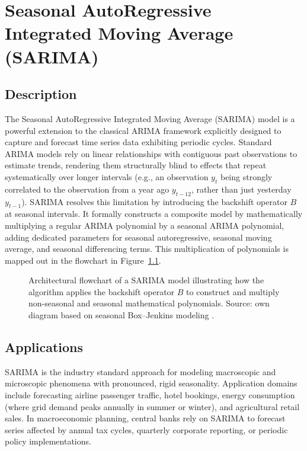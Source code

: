 %
%
%

\chapter{Seasonal AutoRegressive Integrated Moving Average (SARIMA)}
\label{ch:sarima}

\section{Description}
The Seasonal AutoRegressive Integrated Moving Average (SARIMA) model is a powerful extension to the classical ARIMA framework explicitly designed to capture and forecast time series data exhibiting periodic cycles. Standard ARIMA models rely on linear relationships with contiguous past observations to estimate trends, rendering them structurally blind to effects that repeat systematically over longer intervals (e.g., an observation $y_t$ being strongly correlated to the observation from a year ago $y_{t-12}$, rather than just yesterday $y_{t-1}$). SARIMA resolves this limitation by introducing the backshift operator $B$ at seasonal intervals. It formally constructs a composite model by mathematically multiplying a regular ARIMA polynomial by a seasonal ARIMA polynomial, adding dedicated parameters for seasonal autoregressive, seasonal moving average, and seasonal differencing terms. This multiplication of polynomials is mapped out in the flowchart in Figure~\ref{fig:sarima_tikz}.

\begin{figure}[htbp]
\centering
\resizebox{\linewidth}{!}{

}
\caption{Architectural flowchart of a SARIMA model illustrating how the algorithm applies the backshift operator $B$ to construct and multiply non-seasonal and seasonal mathematical polynomials. Source: own diagram based on seasonal Box--Jenkins modeling \cite{Box2015,Hyndman2021}.}
\label{fig:sarima_tikz}
\end{figure}

\section{Applications}
SARIMA is the industry standard approach for modeling macroscopic and microscopic phenomena with pronounced, rigid seasonality. Application domains include forecasting airline passenger traffic, hotel bookings, energy consumption (where grid demand peaks annually in summer or winter), and agricultural retail sales. In macroeconomic planning, central banks rely on SARIMA to forecast series affected by annual tax cycles, quarterly corporate reporting, or periodic policy implementations.

